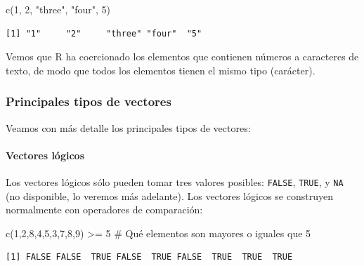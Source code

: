 \documentclass[
  letterpaper,
  DIV=11,
  numbers=noendperiod]{scrreprt}
\let\oldparagraph\paragraph
\renewcommand{\paragraph}[1]{\oldparagraph{#1}\mbox{}}
\newenvironment{Shaded}{\begin{snugshade}}{\end{snugshade}}
\newcommand{\CommentTok}[1]{\textcolor[rgb]{0.37,0.37,0.37}{#1}}
\newcommand{\DecValTok}[1]{\textcolor[rgb]{0.68,0.00,0.00}{#1}}
\newcommand{\FunctionTok}[1]{\textcolor[rgb]{0.28,0.35,0.67}{#1}}
\newcommand{\NormalTok}[1]{\textcolor[rgb]{0.00,0.23,0.31}{#1}}
\newcommand{\SpecialCharTok}[1]{\textcolor[rgb]{0.37,0.37,0.37}{#1}}
\newcommand{\StringTok}[1]{\textcolor[rgb]{0.13,0.47,0.30}{#1}}
\begin{document}
\begin{Shaded}
\begin{Highlighting}[]
\FunctionTok{c}\NormalTok{(}\DecValTok{1}\NormalTok{, }\DecValTok{2}\NormalTok{, }\StringTok{"three"}\NormalTok{, }\StringTok{"four"}\NormalTok{, }\DecValTok{5}\NormalTok{)}
\end{Highlighting}
\end{Shaded}

\begin{verbatim}
[1] "1"     "2"     "three" "four"  "5"    
\end{verbatim}

Vemos que R ha coercionado los elementos que contienen números a
caracteres de texto, de modo que todos los elementos tienen el mismo
tipo (carácter).

\hypertarget{principales-tipos-de-vectores}{%
\subsubsection{Principales tipos de
vectores}\label{principales-tipos-de-vectores}}

Veamos con más detalle los principales tipos de vectores:

\hypertarget{vectores-luxf3gicos}{%
\paragraph{Vectores lógicos}\label{vectores-luxf3gicos}}

Los vectores lógicos sólo pueden tomar tres valores posibles:
\texttt{FALSE}, \texttt{TRUE}, y \texttt{NA} (no disponible, lo veremos
más adelante). Los vectores lógicos se construyen normalmente con
operadores de comparación:

\begin{Shaded}
\begin{Highlighting}[]
\FunctionTok{c}\NormalTok{(}\DecValTok{1}\NormalTok{,}\DecValTok{2}\NormalTok{,}\DecValTok{8}\NormalTok{,}\DecValTok{4}\NormalTok{,}\DecValTok{5}\NormalTok{,}\DecValTok{3}\NormalTok{,}\DecValTok{7}\NormalTok{,}\DecValTok{8}\NormalTok{,}\DecValTok{9}\NormalTok{) }\SpecialCharTok{\textgreater{}=} \DecValTok{5}   \CommentTok{\# Qué elementos son mayores o iguales que 5}
\end{Highlighting}
\end{Shaded}

\begin{verbatim}
[1] FALSE FALSE  TRUE FALSE  TRUE FALSE  TRUE  TRUE  TRUE
\end{verbatim}
\end{document}
